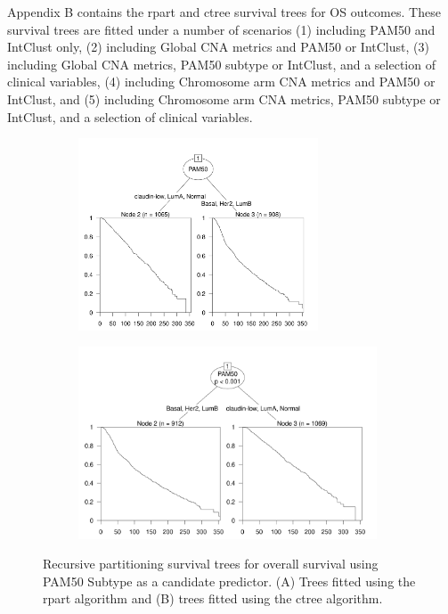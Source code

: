 Appendix B contains the rpart and ctree survival trees for OS outcomes. These survival trees are fitted under a number of scenarios (1) including PAM50 and IntClust only, (2) including Global CNA metrics and PAM50 or IntClust, (3) including Global CNA metrics, PAM50 subtype or IntClust, and a selection of clinical variables, (4) including Chromosome arm CNA metrics and PAM50 or IntClust, and (5) including Chromosome arm CNA metrics, PAM50 subtype or IntClust, and a selection of clinical variables. 


\begin{figure}[!htbp]
\centering

\begin{minipage}{.44\textwidth}
\begin{subfigure}{\textwidth}
\subcaption{}
\includegraphics[width=\linewidth, height = 5.7cm]{../figures/Appendices/Appendix_B/Ind_Partykit_Survival_Score_OS_PAM50.png}
\end{subfigure}\par
\end{minipage}
\begin{minipage}{.55\textwidth}
\begin{subfigure}{\textwidth}
\subcaption{}
\includegraphics[width=\linewidth, height = 5.7cm]{../figures/Appendices/Appendix_B/Ind_Ctree_Survival_Score_OS_PAM50.png}
\end{subfigure}\par
\end{minipage}

\caption[Recursive partitioning survival trees for overall survival using PAM50 Subtype as a candidate predictor.]{Recursive partitioning survival trees for overall survival using PAM50 Subtype as a candidate predictor. (A) Trees fitted using the rpart algorithm and (B) trees fitted using the ctree algorithm.}
\end{figure}


